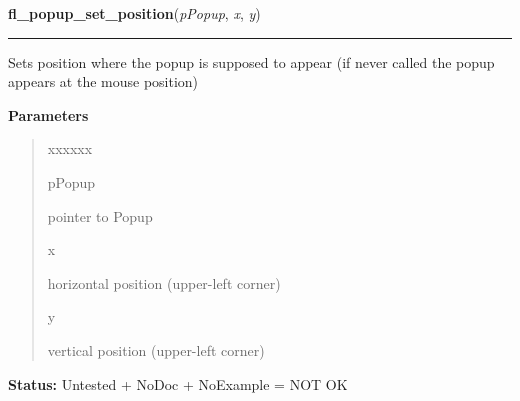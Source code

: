     \vspace{0.5ex}

\hspace{.8\funcindent}\begin{boxedminipage}{\funcwidth}

    \raggedright \textbf{fl\_popup\_set\_position}(\textit{pPopup}, \textit{x}, \textit{y})

    \vspace{-1.5ex}

    \rule{\textwidth}{0.5\fboxrule}
\setlength{\parskip}{2ex}
    Sets position where the popup is supposed to appear (if never called 
    the popup appears at the mouse position)

\setlength{\parskip}{1ex}
      \textbf{Parameters}
      \vspace{-1ex}

      \begin{quote}
        \begin{Ventry}{xxxxxx}

          \item[pPopup]

          pointer to Popup

          \item[x]

          horizontal position (upper-left corner)

          \item[y]

          vertical position (upper-left corner)

        \end{Ventry}

      \end{quote}

\textbf{Status:} Untested + NoDoc + NoExample = NOT OK



    \end{boxedminipage}

    \label{xformslib:library:fl_popup_get_policy}

    \vspace{0.5ex}

